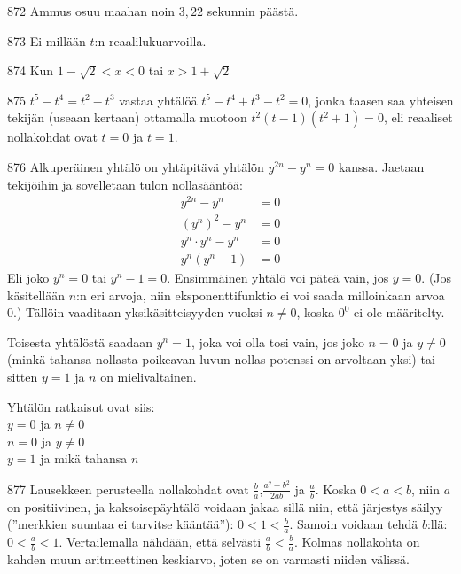 \begin{Vastaus}{872}
	Ammus osuu maahan noin $3,22$ sekunnin päästä. %
	
\end{Vastaus}
\begin{Vastaus}{873}
Ei millään $t$:n reaalilukuarvoilla.
	
\end{Vastaus}
\begin{Vastaus}{874}
	Kun $1-\sqrt{2}<x<0$ tai $x>1+\sqrt{2}$
	
\end{Vastaus}
\begin{Vastaus}{875}
$t^5-t^4=t^2-t^3$ vastaa yhtälöä $t^5-t^4+t^3-t^2=0$, jonka taasen saa yhteisen tekijän (useaan kertaan) ottamalla muotoon $t^2(t-1)(t^2+1)=0$, eli reaaliset nollakohdat ovat $t=0$ ja $t=1$.
	
\end{Vastaus}
\begin{Vastaus}{876}
Alkuperäinen yhtälö on yhtäpitävä yhtälön $y^{2n}-y^n=0$ kanssa. Jaetaan tekijöihin ja sovelletaan tulon nollasääntöä:
	\begin{align*}
	y^{2n}-y^n&=0 \\
	(y^n)^2-y^n&=0 \\
	y^n \cdot y^n-y^n&=0 \\
	y^n(y^n-1)&=0
	\end{align*}
Eli joko $y^n=0$ tai $y^n-1=0$.	 Ensimmäinen yhtälö voi päteä vain, jos $y=0$. (Jos käsitellään $n$:n eri arvoja, niin eksponenttifunktio ei voi saada milloinkaan arvoa $0$.) Tällöin vaaditaan yksikäsitteisyyden vuoksi $n\neq0$, koska $0^0$ ei ole määritelty.

Toisesta yhtälöstä saadaan $y^n=1$, joka voi olla tosi vain, jos joko $n=0$ ja $y \neq 0$ (minkä tahansa nollasta poikeavan luvun nollas potenssi on arvoltaan yksi) tai sitten $y=1$ ja $n$ on mielivaltainen.

Yhtälön ratkaisut ovat siis: \\
$y=0$ ja $n \neq 0$ \\
$n=0$ ja $y \neq 0$ \\
$y=1$ ja mikä tahansa $n$
	
\end{Vastaus}
\begin{Vastaus}{877}
Lausekkeen perusteella nollakohdat ovat $\frac{b}{a}$,$\frac{a^2+b^2}{2ab}$ ja $\frac{a}{b}$. Koska $0<a<b$, niin $a$ on positiivinen, ja kaksoisepäyhtälö voidaan jakaa sillä niin, että järjestys säilyy (''merkkien suuntaa ei tarvitse kääntää''): $0<1<\frac{b}{a}$. Samoin voidaan tehdä $b$:llä: $0<\frac{a}{b}<1$. Vertailemalla nähdään, että selvästi $\frac{a}{b}<\frac{b}{a}$. Kolmas nollakohta on kahden muun aritmeettinen keskiarvo, joten se on varmasti niiden välissä.
		
\end{Vastaus}
